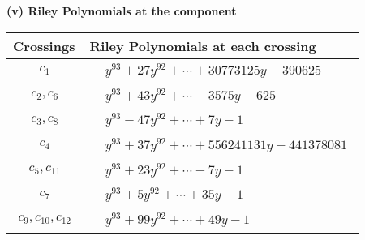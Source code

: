 \documentclass[1p]{elsarticle_modified}
\theoremstyle{definition}
\begin{document}
\flushleft \textbf{(v) Riley Polynomials at the component}\newline \\
\begin{tabular}{m{50pt}|m{274pt}}
Crossings & \hspace{64pt}Riley Polynomials at each crossing \\
\hline $$\begin{aligned}c_{1}\end{aligned}$$&$\begin{aligned}
&y^{93}+27 y^{92}+\cdots+30773125 y-390625
\end{aligned}$\\
\hline $$\begin{aligned}c_{2},c_{6}\end{aligned}$$&$\begin{aligned}
&y^{93}+43 y^{92}+\cdots-3575 y-625
\end{aligned}$\\
\hline $$\begin{aligned}c_{3},c_{8}\end{aligned}$$&$\begin{aligned}
&y^{93}-47 y^{92}+\cdots+7 y-1
\end{aligned}$\\
\hline $$\begin{aligned}c_{4}\end{aligned}$$&$\begin{aligned}
&y^{93}+37 y^{92}+\cdots+556241131 y-441378081
\end{aligned}$\\
\hline $$\begin{aligned}c_{5},c_{11}\end{aligned}$$&$\begin{aligned}
&y^{93}+23 y^{92}+\cdots-7 y-1
\end{aligned}$\\
\hline $$\begin{aligned}c_{7}\end{aligned}$$&$\begin{aligned}
&y^{93}+5 y^{92}+\cdots+35 y-1
\end{aligned}$\\
\hline $$\begin{aligned}c_{9},c_{10},c_{12}\end{aligned}$$&$\begin{aligned}
&y^{93}+99 y^{92}+\cdots+49 y-1
\end{aligned}$\\
\hline
\end{tabular}\\~\\
\end{document}
